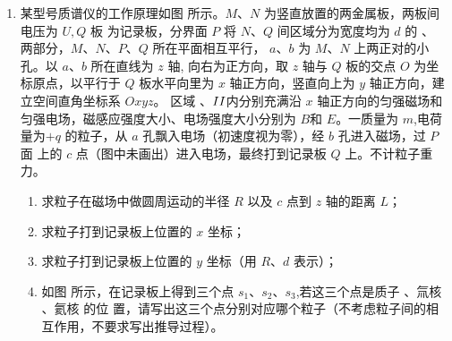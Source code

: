 \begin{enumerate}






\newpage
\item
某型号质谱仪的工作原理如图  所示。$ M $、$ N $ 为竖直放置的两金属板，两板间电压为 $ U,Q $ 板
为记录板，分界面 $ P $ 将 $ N $、$ Q $ 间区域分为宽度均为 $ d $ 的  、  两部分，$ M $、$ N $、$ P $、$ Q $ 所在平面相互平行，
$ a $、$ b $ 为 $ M $、$ N $ 上两正对的小孔。以 $ a $、$ b $ 所在直线为 $ z $ 轴, 向右为正方向，取 $ z $ 轴与 $ Q $ 板的交点 $ O $ 为坐
标原点，以平行于 $ Q $ 板水平向里为 $ x $ 轴正方向，竖直向上为 $ y $ 轴正方向，建立空间直角坐标系 $ Oxyz $。
区域  、$ \lmd{2} $内分别充满沿 $ x $ 轴正方向的匀强磁场和匀强电场，磁感应强度大小、电场强度大小分别为 $ B $和 $ E $。一质量为 $ m $,电荷量为$ +q $ 的粒子，从 $ a $ 孔飘入电场（初速度视为零），经 $ b $ 孔进入磁场，过 $ P $ 面
上的 $ c $ 点（图中未画出）进入电场，最终打到记录板 $ Q $ 上。不计粒子重力。
\begin{enumerate}
\item
求粒子在磁场中做圆周运动的半径 $ R $ 以及 $ c $ 点到 $ z $ 轴的距离 $ L $；
\item 
求粒子打到记录板上位置的 $ x $ 坐标；
\item 
求粒子打到记录板上位置的 $ y $ 坐标（用 $ R $、$ d $ 表示）；
\item 
如图  所示，在记录板上得到三个点 $ s_{1} $、$ s_{2} $、$ s_{3} $,若这三个点是质子  、氚核  、氦核  的位
置，请写出这三个点分别对应哪个粒子（不考虑粒子间的相互作用，不要求写出推导过程）。

\end{enumerate}
\begin{figure}[h!]
\flushright
\begin{subfigure}{0.4\linewidth}
\centering
 
\caption{}\label{2020:山东:17a}
\end{subfigure}
\begin{subfigure}{0.4\linewidth}
\centering
 
\caption{}\label{2020:山东:17b}
\end{subfigure}	
\end{figure}



\end{enumerate}
